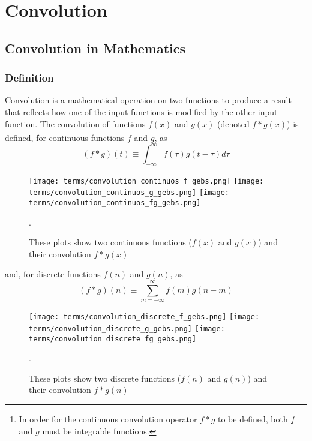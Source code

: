 \chapter[Convolution]{Convolution}
\label{ch:convolution}
\section{Convolution in Mathematics}
\label{sec:convolution:mathematics}
\subsection{Definition}
\label{sec:convolution:mathematics:definitions}
Convolution is a mathematical operation on two functions to produce a result that reflects how one of the input functions is modified by the other input function.\newline
The convolution of functions $f(x)$ and $g(x)$ (denoted $f*g(x)$) is defined\cite{Bracewell2000}, for continuous functions $f$ and $g$, as\footnote{In order for the continuous convolution operator $f * g$ to be defined, both $f$ and $g$ must be integrable functions.}
\begin{equation}
(f * g) (t)\equiv\int_{-\infty}^{\infty} f(\tau) g(t-\tau)d\tau
\end{equation}
\begin{figure*}[h]
    \texttt{[image: terms/convolution\_continuos\_f\_gebs.png]}
    \texttt{[image: terms/convolution\_continuos\_g\_gebs.png]}
    \texttt{[image: terms/convolution\_continuos\_fg\_gebs.png]}
    \caption{These plots show two continuous functions ($f(x)$ and $g(x)$) and their convolution $f*g(x)$}.
    \label{fig:continuousconvolution}
\end{figure*}\FloatBarrier
and, for discrete functions $f(n)$ and $g(n)$, as
\begin{equation}
(f * g)(n)\equiv\sum_{m=-\infty}^{\infty}f(m) g(n-m)
\end{equation}
\begin{figure*}[h]
    \texttt{[image: terms/convolution\_discrete\_f\_gebs.png]}
    \texttt{[image: terms/convolution\_discrete\_g\_gebs.png]}
    \texttt{[image: terms/convolution\_discrete\_fg\_gebs.png]}
    \caption{These plots show two discrete functions ($f(n)$ and $g(n)$) and their convolution $f*g(n)$}.
    \label{fig:discreteconvolution}
\end{figure*}\FloatBarrier
